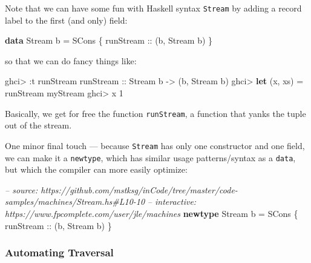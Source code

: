 \documentclass[]{article}
\newenvironment{Shaded}{\begin{snugshade}}{\end{snugshade}}
\newcommand{\CommentTok}[1]{\textcolor[rgb]{0.56,0.35,0.01}{\textit{#1}}}
\newcommand{\DataTypeTok}[1]{\textcolor[rgb]{0.13,0.29,0.53}{#1}}
\newcommand{\DecValTok}[1]{\textcolor[rgb]{0.00,0.00,0.81}{#1}}
\newcommand{\FunctionTok}[1]{\textcolor[rgb]{0.00,0.00,0.00}{#1}}
\newcommand{\KeywordTok}[1]{\textcolor[rgb]{0.13,0.29,0.53}{\textbf{#1}}}
\newcommand{\NormalTok}[1]{#1}
\newcommand{\OtherTok}[1]{\textcolor[rgb]{0.56,0.35,0.01}{#1}}
\begin{document}
Note that we can have some fun with Haskell syntax \texttt{Stream} by adding a
record label to the first (and only) field:

\begin{Shaded}
\begin{Highlighting}[]
\KeywordTok{data} \DataTypeTok{Stream}\NormalTok{ b }\FunctionTok{=} \DataTypeTok{SCons}\NormalTok{ \{}\OtherTok{ runStream ::}\NormalTok{ (b, }\DataTypeTok{Stream}\NormalTok{ b) \}}
\end{Highlighting}
\end{Shaded}

so that we can do fancy things like:

\begin{Shaded}
\begin{Highlighting}[]
\NormalTok{ghci}\FunctionTok{>} \FunctionTok{:}\NormalTok{t runStream}
\OtherTok{runStream ::} \DataTypeTok{Stream}\NormalTok{ b }\OtherTok{->}\NormalTok{ (b, }\DataTypeTok{Stream}\NormalTok{ b)}
\NormalTok{ghci}\FunctionTok{>} \KeywordTok{let}\NormalTok{ (x, xs) }\FunctionTok{=}\NormalTok{ runStream myStream}
\NormalTok{ghci}\FunctionTok{>}\NormalTok{ x}
\DecValTok{1}
\end{Highlighting}
\end{Shaded}

Basically, we get for free the function \texttt{runStream}, a function that
yanks the tuple out of the stream.

One minor final touch --- because \texttt{Stream} has only one constructor and
one field, we can make it a \texttt{newtype}, which has similar usage
patterns/syntax as a \texttt{data}, but which the compiler can more easily
optimize:

\begin{Shaded}
\begin{Highlighting}[]
\CommentTok{-- source: https://github.com/mstksg/inCode/tree/master/code-samples/machines/Stream.hs#L10-10}
\CommentTok{-- interactive: https://www.fpcomplete.com/user/jle/machines}
\KeywordTok{newtype} \DataTypeTok{Stream}\NormalTok{ b }\FunctionTok{=} \DataTypeTok{SCons}\NormalTok{ \{}\OtherTok{ runStream ::}\NormalTok{ (b, }\DataTypeTok{Stream}\NormalTok{ b) \}}
\end{Highlighting}
\end{Shaded}

\hypertarget{automating-traversal}{%
\subsubsection{Automating Traversal}\label{automating-traversal}}
\end{document}
